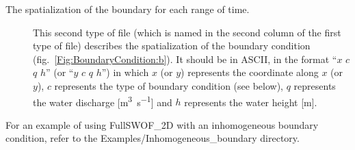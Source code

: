 \documentclass[a4paper, 11pt]{article}
\newcommand{\FullSWOF}{FullSWOF\_2D}
\begin{document}
\begin{description}
	\item[The spatialization of the boundary for each range of time.]
	      This second type of file (which is named in the second column of the first type of file) describes the spatialization of the boundary condition (fig.~\ref{Fig:BoundaryCondition:b}).
	      It should be in ASCII, in the format ``\(x\) \(c\) \(q\) \(h\)'' (or ``\(y\) \(c\) \(q\) \(h\)'') in which \(x\) (or \(y\)) represents the coordinate along \(x\) (or \(y\)), \(c\) represents the type of boundary condition (see below), \(q\) represents the water discharge [\si{\cubic\meter\per\second}] and \(h\) represents the water height [\si{\meter}].
\end{description}
\medskip
For an example of using \FullSWOF{} with an inhomogeneous boundary condition, refer to the \textsf{Examples/Inhomogeneous\_boundary} directory.
\end{document}
